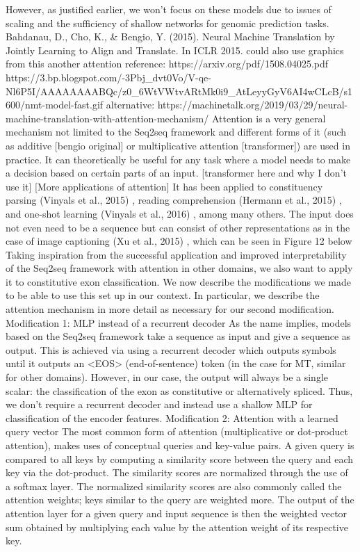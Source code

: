 However, as justified earlier, we won't focus on these models due to issues of scaling and the sufficiency of shallow networks for genomic prediction tasks.
Bahdanau, D., Cho, K., & Bengio, Y. (2015). Neural Machine Translation by Jointly Learning to Align and Translate. In ICLR 2015.
could also use graphics from this
another attention reference: https://arxiv.org/pdf/1508.04025.pdf
https://3.bp.blogspot.com/-3Pbj_dvt0Vo/V-qe-Nl6P5I/AAAAAAAABQc/z0_6WtVWtvARtMk0i9_AtLeyyGyV6AI4wCLcB/s1600/nmt-model-fast.gif
alternative: https://machinetalk.org/2019/03/29/neural-machine-translation-with-attention-mechanism/
Attention is a very general mechanism not limited to the Seq2seq framework and different forms of it (such as additive [bengio original] or multiplicative attention [transformer]) are used in practice. It can theoretically be useful for any task where a model needs to make a decision based on certain parts of an input.
[transformer here and why I don't use it]
[More applications of attention]
It has been applied to constituency parsing (Vinyals et al., 2015)
, reading comprehension (Hermann et al., 2015)
, and one-shot learning (Vinyals et al., 2016)
, among many others. The input does not even need to be a sequence but can consist of other representations as in the case of image captioning (Xu et al., 2015)
, which can be seen in Figure 12 below
Taking inspiration from the successful application and improved interpretability of the Seq2seq framework with attention in other domains, we also want to apply it to constitutive exon classification. We now describe the modifications we made to be able to use this set up in our context. In particular, we describe the attention mechanism in more detail as necessary for our second modification.
Modification 1: MLP instead of a recurrent decoder
As the name implies, models based on the Seq2seq framework take a sequence as input and give a sequence as output. This is achieved via using a recurrent decoder which outputs symbols until it outputs an <EOS> (end-of-sentence) token (in the case for MT, similar for other domains). However, in our case, the output will always be a single scalar: the classification of the exon as constitutive or alternatively spliced. Thus, we don't require a recurrent decoder and instead use a shallow MLP for classification of the encoder features.
Modification 2: Attention with a learned query vector
The most common form of attention (multiplicative or dot-product attention), makes uses of conceptual queries and key-value pairs. A given query is compared to all keys by computing a similarity score between the query and each key via the dot-product. The similarity scores are normalized through the use of a softmax layer. The normalized similarity scores are also commonly called the attention weights; keys similar to the query are weighted more. The output of the attention layer for a given query and input sequence is then the weighted vector sum obtained by multiplying each value by the attention weight of its respective key.
